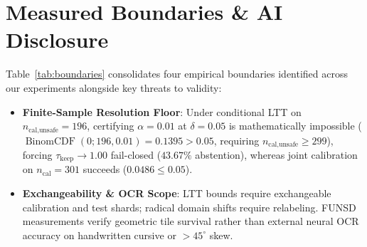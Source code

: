 \documentclass{article}
\begin{document}
\begin{table}[t]
\caption{Downstream held-out ablation ($n_{\text{test}}=300$) over training shard sizes $N_{\text{train}} \in \{100, 300, 606\}$. Gate BCE and VeRA BCE measure held-out classification loss of the linear gate and \texttt{mle\_dl\_vera\_loss\_grad} WASM adapter respectively (not generative token perplexity).}
\label{tab:ablation}
\vskip 0.08in
\begin{center}
\end{center}
\vskip -0.14in
\end{table}

\section{Measured Boundaries \& AI Disclosure}
\label{sec:boundaries}

Table~\ref{tab:boundaries} consolidates four empirical boundaries identified across our experiments alongside key threats to validity:
\begin{itemize}
    \item \textbf{Finite-Sample Resolution Floor}: Under conditional LTT on $n_{\text{cal,unsafe}}=196$, certifying $\alpha=0.01$ at $\delta=0.05$ is mathematically impossible ($\operatorname{BinomCDF}(0; 196, 0.01)=0.1395 > 0.05$, requiring $n_{\text{cal,unsafe}} \ge 299$), forcing $\tau_{\text{keep}} \to 1.00$ fail-closed ($43.67\%$ abstention), whereas joint calibration on $n_{\text{cal}}=301$ succeeds ($0.0486 \le 0.05$).
    \item \textbf{Exchangeability \& OCR Scope}: LTT bounds require exchangeable calibration and test shards; radical domain shifts require relabeling. FUNSD measurements verify geometric tile survival rather than external neural OCR accuracy on handwritten cursive or $>45^\circ$ skew.
\end{itemize}
\end{document}
